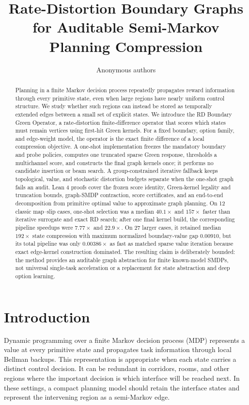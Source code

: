 \documentclass[10pt]{article}
\title{Rate-Distortion Boundary Graphs for Auditable Semi-Markov Planning Compression}
\author{Anonymous authors}
\date{}
\begin{document}
\maketitle

\begin{abstract}
Planning in a finite Markov decision process repeatedly propagates reward
information through every primitive state, even when large regions have nearly
uniform control structure. We study whether such regions can instead be stored
as temporally extended edges between a small set of explicit states. We
introduce the RD Boundary Green Operator, a rate-distortion finite-difference
operator that scores which states must remain vertices using first-hit Green
kernels. For a fixed boundary, option family, and edge-weight model, the
operator is the exact finite difference of a local compression objective. A
one-shot implementation freezes the mandatory boundary and probe policies,
computes one truncated sparse Green response, thresholds a multichannel score,
and constructs the final graph kernels once; it performs no candidate
insertion or beam search. A group-constrained iterative fallback keeps
topological, value, and stochastic distortion budgets separate when the
one-shot graph fails an audit. Lean 4 proofs cover the frozen score identity, Green-kernel
legality and truncation bounds, graph-SMDP contraction, score certificates, and
an end-to-end decomposition from primitive optimal value to approximate graph
planning. On 12 classic map--slip cases, one-shot selection was a median
$40.1\times$ and $157\times$ faster than iterative surrogate and exact RD
search; after one final kernel build, the corresponding pipeline speedups were
$7.77\times$ and $22.9\times$. On 27 larger cases, it retained median
$192\times$ state compression with maximum normalized boundary-value gap
$0.00910$, but its total pipeline was only $0.00386\times$ as fast as matched
sparse value iteration because exact edge-kernel construction dominated. The
resulting claim is deliberately bounded: the method provides an auditable graph
abstraction for finite known-model SMDPs, not universal single-task acceleration
or a replacement for state abstraction and deep option learning.
\end{abstract}

\section{Introduction}
Dynamic programming over a finite Markov decision process (MDP) represents a
value at every primitive state and propagates task information through local
Bellman backups. This representation is appropriate when each state carries a
distinct control decision. It can be redundant in corridors, rooms, and other
regions where the important decision is which interface will be reached next.
In these settings, a compact planning model should retain the interface states
and represent the intervening region as a semi-Markov edge.
\end{document}
